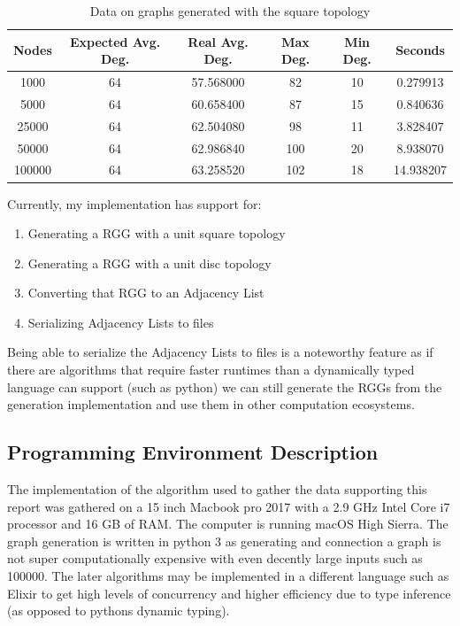 \documentclass{article}
\begin{document}
	\begin{center}
	  \begin{table}[H]
			\begin{tabular}{ |c|c|c|c|c|c| }
				\hline
				Nodes & Expected Avg. Deg. & Real Avg. Deg. & Max Deg. & Min Deg. & Seconds \\
				\hline
				1000 & 64 & 57.568000 & 82 & 10 & 0.279913 \\
				\hline
				5000 & 64 & 60.658400 & 87 & 15 & 0.840636 \\
				\hline
				25000 & 64 & 62.504080 & 98 & 11 & 3.828407 \\
				\hline
				50000 & 64 & 62.986840 & 100 & 20 & 8.938070 \\
				\hline
				100000 & 64 & 63.258520 & 102 & 18 & 14.938207 \\
				\hline
			\end{tabular}
			\caption{Data on graphs generated with the square topology}
		\end{table}
	\end{center}

  Currently, my implementation has support for:
  \begin{enumerate}
  \item Generating a RGG with a unit square topology
  \item Generating a RGG with a unit disc topology
  \item Converting that RGG to an Adjacency List
  \item Serializing Adjacency Lists to files
  \end{enumerate}
  Being able to serialize the Adjacency Lists to files is a noteworthy feature as if there are algorithms that require faster runtimes than a dynamically typed language can support (such as python) we can still generate the RGGs from the generation implementation  and use them in other computation ecosystems.

  \subsection{Programming Environment Description}
		The implementation of the algorithm used to gather the data supporting this report was gathered on a 15 inch Macbook pro 2017 with a 2.9 GHz Intel Core i7 processor and 16 GB of RAM.
		The computer is running macOS High Sierra.
		The graph generation is written in python 3 as generating and connection a graph is not super computationally expensive with even decently large inputs such as 100000.
		The later algorithms may be implemented in a different language such as Elixir to get high levels of concurrency and higher efficiency due to type inference (as opposed to pythons dynamic typing).
\end{document}
